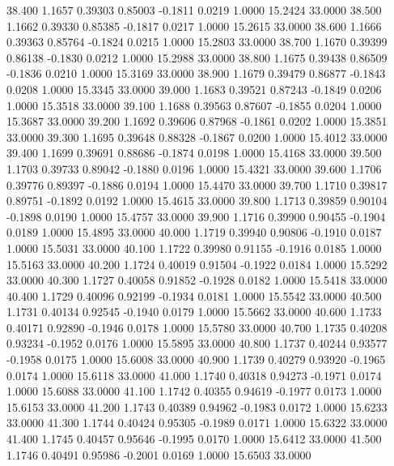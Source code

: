   38.400   1.1657   0.39303   0.85003  -0.1811   0.0219   1.0000  15.2424  33.0000
  38.500   1.1662   0.39330   0.85385  -0.1817   0.0217   1.0000  15.2615  33.0000
  38.600   1.1666   0.39363   0.85764  -0.1824   0.0215   1.0000  15.2803  33.0000
  38.700   1.1670   0.39399   0.86138  -0.1830   0.0212   1.0000  15.2988  33.0000
  38.800   1.1675   0.39438   0.86509  -0.1836   0.0210   1.0000  15.3169  33.0000
  38.900   1.1679   0.39479   0.86877  -0.1843   0.0208   1.0000  15.3345  33.0000
  39.000   1.1683   0.39521   0.87243  -0.1849   0.0206   1.0000  15.3518  33.0000
  39.100   1.1688   0.39563   0.87607  -0.1855   0.0204   1.0000  15.3687  33.0000
  39.200   1.1692   0.39606   0.87968  -0.1861   0.0202   1.0000  15.3851  33.0000
  39.300   1.1695   0.39648   0.88328  -0.1867   0.0200   1.0000  15.4012  33.0000
  39.400   1.1699   0.39691   0.88686  -0.1874   0.0198   1.0000  15.4168  33.0000
  39.500   1.1703   0.39733   0.89042  -0.1880   0.0196   1.0000  15.4321  33.0000
  39.600   1.1706   0.39776   0.89397  -0.1886   0.0194   1.0000  15.4470  33.0000
  39.700   1.1710   0.39817   0.89751  -0.1892   0.0192   1.0000  15.4615  33.0000
  39.800   1.1713   0.39859   0.90104  -0.1898   0.0190   1.0000  15.4757  33.0000
  39.900   1.1716   0.39900   0.90455  -0.1904   0.0189   1.0000  15.4895  33.0000
  40.000   1.1719   0.39940   0.90806  -0.1910   0.0187   1.0000  15.5031  33.0000
  40.100   1.1722   0.39980   0.91155  -0.1916   0.0185   1.0000  15.5163  33.0000
  40.200   1.1724   0.40019   0.91504  -0.1922   0.0184   1.0000  15.5292  33.0000
  40.300   1.1727   0.40058   0.91852  -0.1928   0.0182   1.0000  15.5418  33.0000
  40.400   1.1729   0.40096   0.92199  -0.1934   0.0181   1.0000  15.5542  33.0000
  40.500   1.1731   0.40134   0.92545  -0.1940   0.0179   1.0000  15.5662  33.0000
  40.600   1.1733   0.40171   0.92890  -0.1946   0.0178   1.0000  15.5780  33.0000
  40.700   1.1735   0.40208   0.93234  -0.1952   0.0176   1.0000  15.5895  33.0000
  40.800   1.1737   0.40244   0.93577  -0.1958   0.0175   1.0000  15.6008  33.0000
  40.900   1.1739   0.40279   0.93920  -0.1965   0.0174   1.0000  15.6118  33.0000
  41.000   1.1740   0.40318   0.94273  -0.1971   0.0174   1.0000  15.6088  33.0000
  41.100   1.1742   0.40355   0.94619  -0.1977   0.0173   1.0000  15.6153  33.0000
  41.200   1.1743   0.40389   0.94962  -0.1983   0.0172   1.0000  15.6233  33.0000
  41.300   1.1744   0.40424   0.95305  -0.1989   0.0171   1.0000  15.6322  33.0000
  41.400   1.1745   0.40457   0.95646  -0.1995   0.0170   1.0000  15.6412  33.0000
  41.500   1.1746   0.40491   0.95986  -0.2001   0.0169   1.0000  15.6503  33.0000

